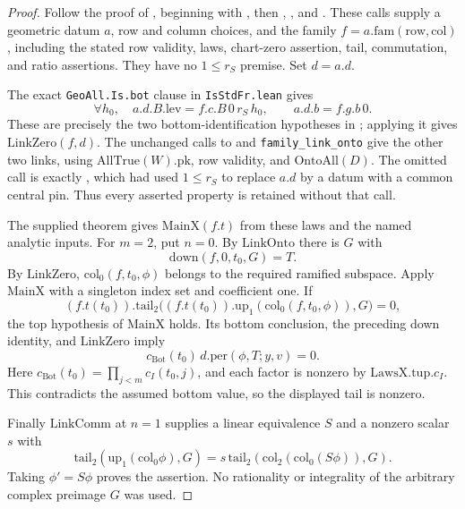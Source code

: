 \documentclass[11pt,a4paper]{article}
\theoremstyle{definition}
\theoremstyle{remark}
\begin{document}
\begin{proof}
Follow the proof of
, beginning with
, then
,
, and
.
These calls supply a geometric datum $a$, row and column choices, and
the family $f=a.\mathrm{fam}(\mathrm{row},\mathrm{col})$, including
the stated row validity, laws, chart-zero assertion, tail,
commutation, and ratio assertions.  They have no $1\leq r_S$
premise.  Set $d=a.d$.

The exact \texttt{GeoAll.Is.bot} clause in
\texttt{IsStdFr.lean} gives
\[
 \forall h_0,\quad a.d.B.\mathrm{lev}=f.c.B\,0\,r_S\,h_0,
 \qquad a.d.b=f.g.b\,0.
\]
These are precisely the two bottom-identification hypotheses in
; applying it gives
$\mathrm{LinkZero}(f,d)$.
The unchanged calls to  and
\texttt{family\_link\_onto} give the other two links, using
$\mathrm{AllTrue}(W).\mathrm{pk}$, row validity, and
$\mathrm{OntoAll}(D)$.  The omitted call is exactly
, which had used $1\leq r_S$
to replace $a.d$ by a datum with a common central pin.  Thus every
asserted property is retained without that call.

The supplied theorem
 gives
$\mathrm{MainX}(f.t)$ from these laws and the named analytic inputs.
For $m=2$, put $n=0$.  By $\mathrm{LinkOnto}$ there is $G$ with
\[
 \mathrm{down}(f,0,t_0,G)=T.
\]
By $\mathrm{LinkZero}$, $\mathrm{col}_0(f,t_0,\phi)$ belongs to
the required ramified subspace.  Apply $\mathrm{MainX}$ with a
singleton index set and coefficient one.  If
\[
 (f.t(t_0)).\mathrm{tail}_2
 \bigl((f.t(t_0)).\mathrm{up}_1(\mathrm{col}_0(f,t_0,\phi)),G\bigr)=0,
\]
the top hypothesis of $\mathrm{MainX}$ holds.  Its bottom conclusion,
the preceding down identity, and $\mathrm{LinkZero}$ imply
\[
 c_{\mathrm{Bot}}(t_0)\,d.\mathrm{per}(\phi,T;y,v)=0.
\]
Here $c_{\mathrm{Bot}}(t_0)=\prod_{j<m}c_I(t_0,j)$, and each factor
is nonzero by $\mathrm{LawsX}.\mathrm{tup}.c_I$.  This contradicts
the assumed bottom value, so the displayed tail is nonzero.

Finally $\mathrm{LinkComm}$ at $n=1$ supplies a linear equivalence
$S$ and a nonzero scalar $s$ with
\[
 \mathrm{tail}_2(\mathrm{up}_1(\mathrm{col}_0\phi),G)
 =s\,\mathrm{tail}_2(\mathrm{col}_2(\mathrm{col}_0(S\phi)),G).
\]
Taking $\phi'=S\phi$ proves the assertion.  No rationality or
integrality of the arbitrary complex preimage $G$ was used.
\end{proof}
\end{document}
